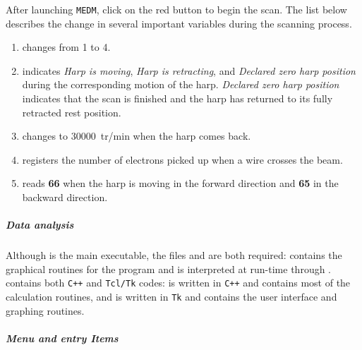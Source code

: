 {After launching {\tt MEDM}, click on the red {\bf{}} button to begin the scan. The list
below describes the  change in several important variables during the scanning process.
\begin{enumerate}
\item {} changes from 1 to 4.
\item {} indicates {\it Harp is moving}, {\it Harp is retracting}, and
	{\it Declared zero harp position} during the corresponding motion of the harp.
	{\it Declared zero harp position} indicates that the scan is finished and the harp has
	returned to its fully retracted rest position.
\item {} changes to 30000~tr/min when the harp comes back.
\item {} registers the number of electrons picked up when a wire crosses the beam.
\item {} reads {\bf 66} when the harp is moving in the forward direction
	and {\bf 65} in the backward direction.
\end{enumerate}


	\subparagraph{Data analysis}\label{analysis}

Although  is the main executable, the files 
and  are both required:  contains the graphical routines
for the program and is interpreted at run-time through .  contains
both {\tt C++} and {\tt Tcl/Tk} codes:  is written in {\tt C++} and contains most
of the calculation routines, and  is written in {\tt Tk} and contains the user
interface and graphing routines.

	\subparagraph{Menu and entry Items}

}
